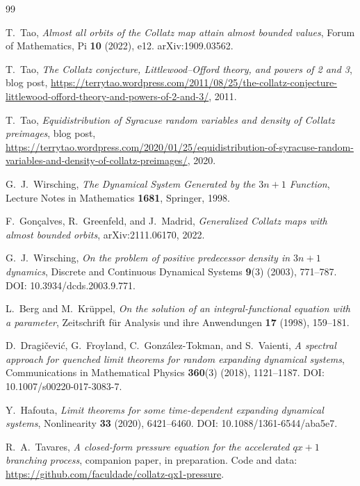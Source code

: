 \documentclass[11pt]{article}
\theoremstyle{definition}
\theoremstyle{remark}
\begin{document}
\begin{thebibliography}{99}

 T.\ Tao, \emph{Almost all orbits of the Collatz map
  attain almost bounded values}, Forum of Mathematics, Pi \textbf{10}
  (2022), e12. arXiv:1909.03562.

 T.\ Tao, \emph{The Collatz conjecture, Littlewood--Offord
  theory, and powers of 2 and 3}, blog post,
  \url{https://terrytao.wordpress.com/2011/08/25/the-collatz-conjecture-littlewood-offord-theory-and-powers-of-2-and-3/},
  2011.

 T.\ Tao, \emph{Equidistribution of Syracuse random
  variables and density of Collatz preimages}, blog post,
  \url{https://terrytao.wordpress.com/2020/01/25/equidistribution-of-syracuse-random-variables-and-density-of-collatz-preimages/},
  2020.

 G.\ J.\ Wirsching, \emph{The Dynamical System
  Generated by the $3n+1$ Function}, Lecture Notes in Mathematics
  \textbf{1681}, Springer, 1998.

 F.\ Gon\c{c}alves, R.\
  Greenfeld, and J.\ Madrid, \emph{Generalized Collatz maps with almost
  bounded orbits}, arXiv:2111.06170, 2022.

 G.\ J.\ Wirsching, \emph{On the problem of
  positive predecessor density in $3n+1$ dynamics}, Discrete and
  Continuous Dynamical Systems \textbf{9}(3) (2003), 771--787.
  DOI: 10.3934/dcds.2003.9.771.

 L.\ Berg and M.\ Kr\"uppel, \emph{On the
  solution of an integral-functional equation with a parameter},
  Zeitschrift f\"ur Analysis und ihre Anwendungen \textbf{17} (1998),
  159--181.

 D.\ Dragi\v{c}evi\'c, G.\ Froyland,
  C.\ Gonz\'alez-Tokman, and S.\ Vaienti, \emph{A spectral approach
  for quenched limit theorems for random expanding dynamical systems},
  Communications in Mathematical Physics \textbf{360}(3) (2018),
  1121--1187. DOI: 10.1007/s00220-017-3083-7.

 Y.\ Hafouta, \emph{Limit theorems for some
  time-dependent expanding dynamical systems}, Nonlinearity
  \textbf{33} (2020), 6421--6460.
  DOI: 10.1088/1361-6544/aba5e7.

 R.\ A.\ Tavares, \emph{A closed-form
  pressure equation for the accelerated $qx+1$ branching process},
  companion paper, in preparation. Code and data:
  \url{https://github.com/faculdade/collatz-qx1-pressure}.


\end{thebibliography}
\end{document}
